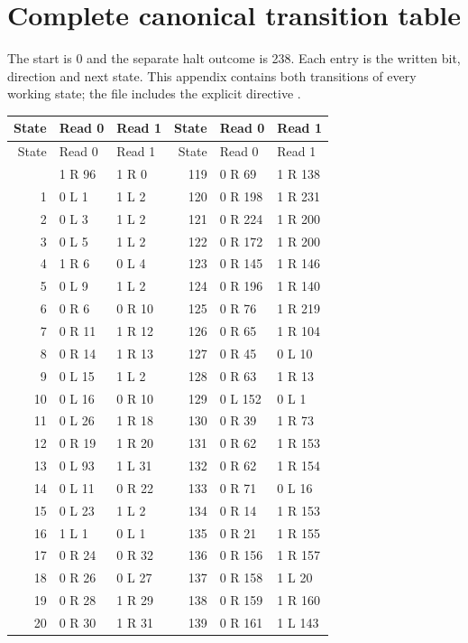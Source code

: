 \section{Complete canonical transition table}
\label{app:table}
The start is 0 and the separate halt outcome is 238. Each entry is the written bit, direction and next state. This appendix contains both transitions of every working state; the file includes the explicit directive .
\begin{center}\small
\begin{longtable}{rll@{\qquad}rll}
\toprule
State & Read 0 & Read 1 & State & Read 0 & Read 1\\\midrule
\endfirsthead
\toprule
State & Read 0 & Read 1 & State & Read 0 & Read 1\\\midrule
\endhead
\bottomrule\endfoot
0 & 1 R 96 & 1 R 0 & 119 & 0 R 69 & 1 R 138\\
1 & 0 L 1 & 1 L 2 & 120 & 0 R 198 & 1 R 231\\
2 & 0 L 3 & 1 L 2 & 121 & 0 R 224 & 1 R 200\\
3 & 0 L 5 & 1 L 2 & 122 & 0 R 172 & 1 R 200\\
4 & 1 R 6 & 0 L 4 & 123 & 0 R 145 & 1 R 146\\
5 & 0 L 9 & 1 L 2 & 124 & 0 R 196 & 1 R 140\\
6 & 0 R 6 & 0 R 10 & 125 & 0 R 76 & 1 R 219\\
7 & 0 R 11 & 1 R 12 & 126 & 0 R 65 & 1 R 104\\
8 & 0 R 14 & 1 R 13 & 127 & 0 R 45 & 0 L 10\\
9 & 0 L 15 & 1 L 2 & 128 & 0 R 63 & 1 R 13\\
10 & 0 L 16 & 0 R 10 & 129 & 0 L 152 & 0 L 1\\
11 & 0 L 26 & 1 R 18 & 130 & 0 R 39 & 1 R 73\\
12 & 0 R 19 & 1 R 20 & 131 & 0 R 62 & 1 R 153\\
13 & 0 L 93 & 1 L 31 & 132 & 0 R 62 & 1 R 154\\
14 & 0 L 11 & 0 R 22 & 133 & 0 R 71 & 0 L 16\\
15 & 0 L 23 & 1 L 2 & 134 & 0 R 14 & 1 R 153\\
16 & 1 L 1 & 0 L 1 & 135 & 0 R 21 & 1 R 155\\
17 & 0 R 24 & 0 R 32 & 136 & 0 R 156 & 1 R 157\\
18 & 0 R 26 & 0 L 27 & 137 & 0 R 158 & 1 L 20\\
19 & 0 R 28 & 1 R 29 & 138 & 0 R 159 & 1 R 160\\
20 & 0 R 30 & 1 R 31 & 139 & 0 R 161 & 1 L 143\\

\end{longtable}
\end{center}
